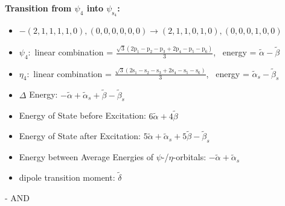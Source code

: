 \documentclass[12pt,a4paper]{article}
\begin{document}
        \noindent\textbf{Transition from $\psi_{4}$ into $\psi_{\text{s}_{4}}$:}
        \begin{itemize}
            \item $- (2, 1, 1, 1, 1, 0), (0, 0, 0, 0, 0, 0) \rightarrow (2, 1, 1, 0, 1, 0), (0, 0, 0, 1, 0, 0)$
        
            \item $\psi_{4}:$ linear combination = $\frac{\sqrt{3} \left(2 \text{p}_{1} - \text{p}_{2} - \text{p}_{3} + 2 \text{p}_{4} - \text{p}_{5} - \text{p}_{6}\right)}{3}$, \
            energy = $\tilde{\alpha} - \tilde{\beta}$
            
            \item $\eta_{4}:$ linear combination = $\frac{\sqrt{3} \left(2 \text{s}_{1} - \text{s}_{2} - \text{s}_{3} + 2 \text{s}_{4} - \text{s}_{5} - \text{s}_{6}\right)}{3}$, \
            energy = $\tilde{\alpha}_{s} - \tilde{\beta}_{s}$
            
                \item $\Delta$ Energy: $- \tilde{\alpha} + \tilde{\alpha}_{s} + \tilde{\beta} - \tilde{\beta}_{s}$
                \item Energy of State before Excitation: $6 \tilde{\alpha} + 4 \tilde{\beta}$
                \item Energy of State after Excitation: $5 \tilde{\alpha} + \tilde{\alpha}_{s} + 5 \tilde{\beta} - \tilde{\beta}_{s}$
                \item Energy between Average Energies of $\psi$-/$\eta$-orbitals: $- \tilde{\alpha} + \tilde{\alpha}_{s}$
            
            \item dipole transition moment: $\tilde{\delta}$
        
        \end{itemize}
        
 -  AND 
\end{document}
